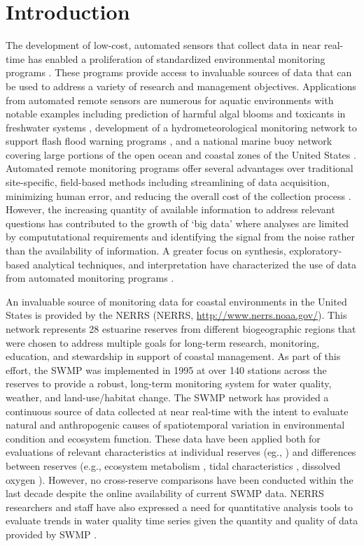 \documentclass[10pt,letterpaper]{article}\usepackage[]{graphicx}\usepackage[]{color}
\begin{document}
\section*{Introduction}

The development of low-cost, automated sensors that collect data in near real-time has enabled a proliferation of standardized environmental monitoring programs \cite{Glasgow04,Fries08}.  These programs provide access to invaluable sources of data that can be used to address a variety of research and management objectives.  Applications from automated remote sensors are numerous for aquatic environments with notable examples including prediction of harmful algal blooms and toxicants in freshwater systems \cite{Reed10}, development of a hydrometeorological monitoring network to support flash flood warning programs \cite{HADS15}, and a national marine buoy network covering large portions of the open ocean and coastal zones of the United States \cite{NDBC15}.  Automated remote monitoring programs offer several advantages over traditional site-specific, field-based methods including streamlining of data acquisition, minimizing human error, and reducing the overall cost of the collection process \cite{Glasgow04}.  However, the increasing quantity of available information to address relevant questions has contributed to the growth of `big data' where analyses are limited by compututational requirements and identifying the signal from the noise rather than the availability of information. A greater focus on synthesis, exploratory-based analytical techniques, and interpretation have characterized the use of data from automated monitoring programs \cite{Campbell13,Millie13}.

An invaluable source of monitoring data for coastal environments in the United States is provided by the \acrlong{NERRS} (\acrshort{NERRS}, \url{http://www.nerrs.noaa.gov/}).  This network represents 28 estuarine reserves from different biogeographic regions that were chosen to address multiple goals for long-term research, monitoring, education, and stewardship in support of coastal management.  As part of this effort, the \acrlong{SWMP} was implemented in 1995 at over 140 stations across the reserves to provide a robust, long-term monitoring system for water quality, weather, and land-use/habitat change.  The \gls{SWMP} network has provided a continuous source of data collected at near real-time with the intent to evaluate natural and anthropogenic causes of spatiotemporal variation in environmental condition and ecosystem function.  These data have been applied both for evaluations of relevant characteristics at individual reserves (eg., \cite{Bulthius95,Dix08}) and differences between reserves (e.g., ecosystem metabolism \cite{Caffrey03,Caffrey04}, tidal characteristics \cite{Sanger02}, dissolved oxygen \cite{Wenner04}).  However, no cross-reserve comparisons have been conducted within the last decade despite the online availability of current \gls{SWMP} data.  \gls{NERRS} researchers and staff have also expressed a need for quantitative analysis tools to evaluate trends in water quality time series given the quantity and quality of data provided by \gls{SWMP} \cite{SWMP14}.          
\end{document}
